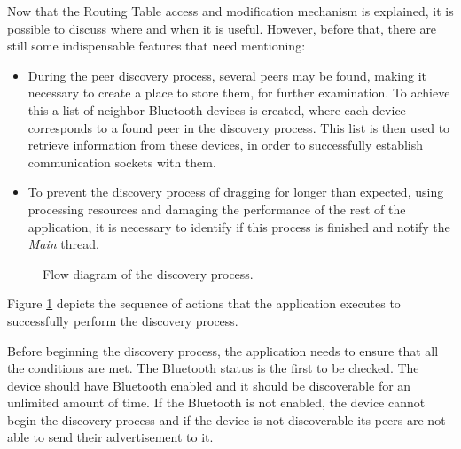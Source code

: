 Now that the Routing Table access and modification mechanism is explained, it is possible to discuss where and when it is useful. However, before that, there are still some indispensable features that need mentioning:

\begin{itemize}
	\item During the peer discovery process, several peers may be found, making it necessary to create a place to store them, for further examination. To achieve this a list of neighbor Bluetooth devices is created, where each device corresponds to a found peer in the discovery process. This list is then used to retrieve information from these devices, in order to successfully establish communication sockets with them.
	
	\item To prevent the discovery process of dragging for longer than expected, using processing resources and damaging the performance of the rest of the application, it is necessary to identify if this process is finished and notify the \textit{Main} thread.
\end{itemize}

\begin{figure}[ht]
	\noindent{}
	\caption{\label{fig:discflux} Flow diagram of the discovery process.}
\end{figure}

Figure \ref{fig:discflux} depicts the sequence of actions that the application executes to successfully perform the discovery process.

Before beginning the discovery process, the application needs to ensure that all the conditions are met. The Bluetooth status is the first to be checked. The device should have Bluetooth enabled and it should be discoverable for an unlimited amount of time. If the Bluetooth is not enabled, the device cannot begin the discovery process and if the device is not discoverable its peers are not able to send their advertisement to it.

